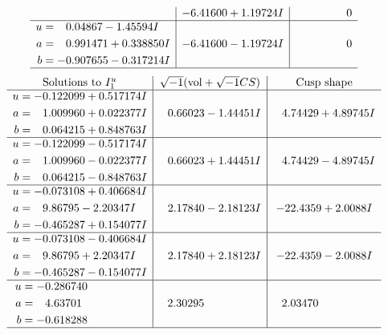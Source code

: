 \documentclass[1p]{elsarticle_modified}
\theoremstyle{definition}
\newcommand{\I}{\sqrt{-1}}
\begin{document}
$$\begin{array}{c|c|c}
 & -6.41600 + 1.19724 I & \phantom{-0.000000 } 0 \\ \hline\begin{aligned}
u &= \phantom{-}0.04867 - 1.45594 I \\
a &= \phantom{-}0.991471 + 0.338850 I \\
b &= -0.907655 - 0.317214 I\end{aligned}
 & -6.41600 - 1.19724 I & \phantom{-0.000000 } 0\\
 \hline 
 \end{array}$$\newpage$$\begin{array}{c|c|c}  
\text{Solutions to }I^u_{1}& \I (\text{vol} + \sqrt{-1}CS) & \text{Cusp shape}\\
 \hline 
\begin{aligned}
u &= -0.122099 + 0.517174 I \\
a &= \phantom{-}1.009960 + 0.022377 I \\
b &= \phantom{-}0.064215 + 0.848763 I\end{aligned}
 & \phantom{-}0.66023 - 1.44451 I & \phantom{-}4.74429 + 4.89745 I \\ \hline\begin{aligned}
u &= -0.122099 - 0.517174 I \\
a &= \phantom{-}1.009960 - 0.022377 I \\
b &= \phantom{-}0.064215 - 0.848763 I\end{aligned}
 & \phantom{-}0.66023 + 1.44451 I & \phantom{-}4.74429 - 4.89745 I \\ \hline\begin{aligned}
u &= -0.073108 + 0.406684 I \\
a &= \phantom{-}9.86795 - 2.20347 I \\
b &= -0.465287 + 0.154077 I\end{aligned}
 & \phantom{-}2.17840 - 2.18123 I & -22.4359 + 2.0088 I \\ \hline\begin{aligned}
u &= -0.073108 - 0.406684 I \\
a &= \phantom{-}9.86795 + 2.20347 I \\
b &= -0.465287 - 0.154077 I\end{aligned}
 & \phantom{-}2.17840 + 2.18123 I & -22.4359 - 2.0088 I \\ \hline\begin{aligned}
u &= -0.286740\phantom{ +0.000000I} \\
a &= \phantom{-}4.63701\phantom{ +0.000000I} \\
b &= -0.618288\phantom{ +0.000000I}\end{aligned}
 & \phantom{-}2.30295\phantom{ +0.000000I} & \phantom{-}2.03470\phantom{ +0.000000I}\\
 \hline 
 \end{array}$$\newpage\newpage\renewcommand{\arraystretch}{1}
\end{document}
